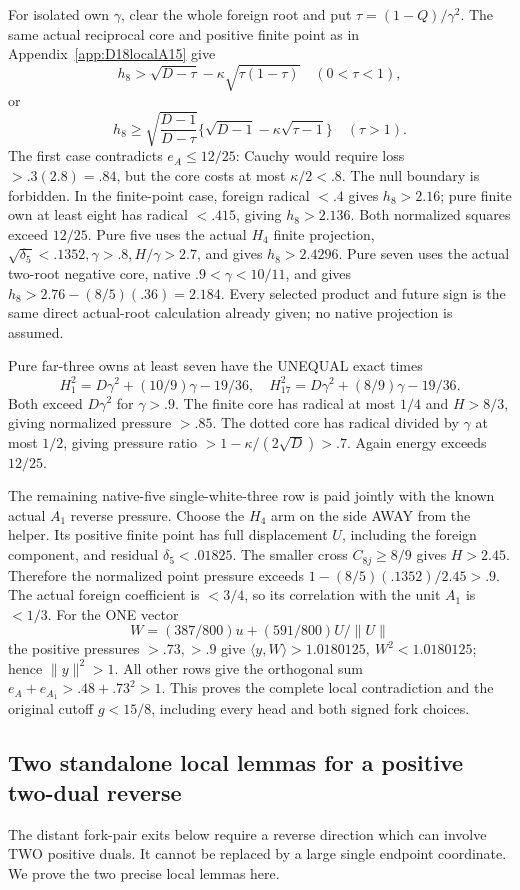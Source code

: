 \documentclass[11pt]{article}
\theoremstyle{definition}
\theoremstyle{remark}
\newcommand{\ip}[2]{\langle #1,#2\rangle}
\newcommand{\norm}[1]{\lVert #1\rVert}
\begin{document}
For isolated own \(\gamma\), clear the whole foreign root and put
\(\tau=(1-Q)/\gamma^2\).
The same actual reciprocal core and positive finite point as in
Appendix~\ref{app:D18localA15} give
\[
 h_8>\sqrt{D-\tau}-\kappa\sqrt{\tau(1-\tau)}
 \quad(0<\tau<1),
\]
or
\[
 h_8\geq\sqrt{\frac{D-1}{D-\tau}}
 \{\sqrt{D-1}-\kappa\sqrt{\tau-1}\}\quad(\tau>1).
\]
The first case contradicts \(e_A\leq12/25\):
Cauchy would require loss \(>.3(2.8)=.84\), but the core costs
at most \(\kappa/2<.8\).
The null boundary is forbidden.
In the finite-point case, foreign radical \(<.4\) gives
\(h_8>2.16\); pure finite own at least eight has radical \(<.415\),
giving \(h_8>2.136\). Both normalized squares exceed \(12/25\).
Pure five uses the actual \(H_4\) finite projection,
\(\sqrt{\delta_5}<.1352,\gamma>.8,H/\gamma>2.7\),
and gives \(h_8>2.4296\).
Pure seven uses the actual two-root negative core, native
\(.9<\gamma<10/11\), and gives
\(h_8>2.76-(8/5)(.36)=2.184\).
Every selected product and future sign is the same direct actual-root
calculation already given; no native projection is assumed.

Pure far-three owns at least seven have the UNEQUAL exact times
\[
 H_1^2=D\gamma^2+(10/9)\gamma-19/36,\quad
 H_{17}^2=D\gamma^2+(8/9)\gamma-19/36 .
\]
Both exceed \(D\gamma^2\) for \(\gamma>.9\).
The finite core has radical at most \(1/4\) and \(H>8/3\),
giving normalized pressure \(>.85\).
The dotted core has radical divided by \(\gamma\) at most \(1/2\),
giving pressure ratio \(>1-\kappa/(2\sqrt D)>.7\).
Again energy exceeds \(12/25\).

The remaining native-five single-white-three row is paid jointly
with the known actual \(A_1\) reverse pressure.
Choose the \(H_4\) arm on the side AWAY from the helper.
Its positive finite point has full displacement \(U\), including
the foreign component, and residual \(\delta_5<.01825\).
The smaller cross \(C_{8j}\geq8/9\) gives \(H>2.45\).
Therefore the normalized point pressure exceeds
\(1-(8/5)(.1352)/2.45>.9\).
The actual foreign coefficient is \(<3/4\), so its correlation
with the unit \(A_1\) is \(<1/3\).
For the ONE vector
\[
 W=(387/800)u+(591/800)U/\norm U
\]
the positive pressures \(>.73,>.9\) give
\(\ip yW>1.0180125,\ W^2<1.0180125\);
hence \(\norm y^2>1\).
All other rows give the orthogonal sum
\(e_A+e_{A_1}>.48+.73^2>1\).
This proves the complete local contradiction and the original cutoff
\(g<15/8\), including every head and both signed fork choices.

\subsection{Two standalone local lemmas for a positive two-dual reverse}
\label{app:D18twodual}
The distant fork-pair exits below require a reverse direction which
can involve TWO positive duals. It cannot be replaced by a large
single endpoint coordinate.
We prove the two precise local lemmas here.
\end{document}
